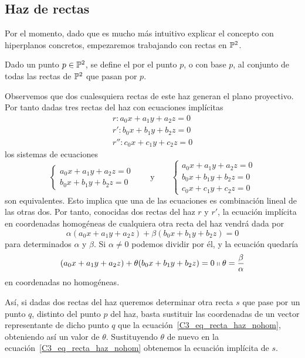 \subsection{Haz de rectas}
Por el momento, dado que es mucho más intuitivo explicar el concepto  con hiperplanos concretos, empezaremos trabajando con rectas en $\mathbb{P}^2$.
\begin{defi}
	Dado un punto $p\in\mathbb{P}^2$, se define el  por el punto $p$, o con base $p$, al conjunto de todas las rectas de $\mathbb{P}^2$ que pasan por $p$.
\end{defi}
Observemos que dos cualesquiera rectas de este haz generan el plano proyectivo. Por tanto dadas tres rectas del haz con ecuaciones implícitas
\begin{equation}
	\label{C3_eq_implicitas_rectas_haz}
	\begin{split}
		r:a_0x+a_1y+a_2z=0\\
		r':b_0x+b_1y+b_2z=0\\
		r'':c_0x+c_1y+c_2z=0
	\end{split}
\end{equation}
los sistemas de ecuaciones 
\begin{equation}
	\begin{cases}
	a_0x+a_1y+a_2z=0\\
	b_0x+b_1y+b_2z=0
	\end{cases} \qquad \text{y} \qquad \begin{cases}
	a_0x+a_1y+a_2z=0\\
	b_0x+b_1y+b_2z=0\\
	c_0x+c_1y+c_2z=0
	\end{cases}
\end{equation}
son equivalentes. Esto implica que una de las ecuaciones es combinación lineal de las otras dos. Por tanto, conocidas dos rectas del haz $r$ y $r'$, la ecuación implícita en coordenadas homogéneas de cualquiera otra recta del haz vendrá dada por
\begin{equation}
	\label{C3_eq_recta_haz}
	\alpha(a_0x+a_1y+a_2z)+\beta(b_0x+b_1y+b_2z)=0
\end{equation}
para determinados $\alpha$ y $\beta$. Si $\alpha\not=0$ podemos dividir por él, y la ecuación quedaría
\begin{equation}
	\label{C3_eq_recta_haz_nohom}
	(a_0x+a_1y+a_2z)+\theta(b_0x+b_1y+b_2z)=0\shortparallel \theta=\frac{\beta}{\alpha}
\end{equation}
en coordenadas no homogéneas. 

Así, si dadas dos rectas del haz queremos determinar otra recta $s$ que pase por un punto $q$, distinto del punto $p$ del haz, basta sustituir las coordenadas de un vector representante de dicho punto $q$ que la ecuación~\eqref{C3_eq_recta_haz_nohom}, obteniendo así un valor de $\theta$. Sustituyendo $\theta$ de nuevo en la ecuación~\eqref{C3_eq_recta_haz_nohom} obtenemos la ecuación implícita de $s$.\\

